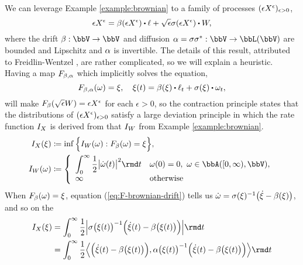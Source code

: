 \begin{example}[Diffusions]
  We can leverage Example \ref{example:brownian} to a family of processes $(\epsilon X^\epsilon)_{\epsilon>0}$,
  \begin{equation}
    \label{eq:F-brownian-drift}
    \Xe = \affDrift(\Xe) \shortInt \leb + \sqrt\epsilon \affDiffSqrt(\Xe) \shortInt \W,
  \end{equation}
  where the drift $\affDrift: \vecSpace \rightarrow \vecSpace$ and diffusion $\affDiff = \affDiffSqrt\affDiffSqrt^*: \vecSpace \rightarrow \bbL(\vecSpace)$ are bounded and Lipschitz and $\alpha$ is invertible.
  The details of this result, attributed to Freidlin-Wentzel \cite[Theorems 5.6.3 and 5.6.7]{dembo2010}, are rather complicated, so we will explain a heuristic.
  Having a map $F_{\beta,\alpha}$ which implicitly solves the equation,
  \begin{equation*}
    F_{\affDrift,\affDiff}(\omega) = \pathVar, \quad \pathVar(t) = \affDrift(\pathVar) \shortInt \leb_t + \affDiffSqrt(\pathVar) \shortInt \omega_t,
  \end{equation*}
  will make $F_\beta(\sqrt\epsilon W) = \epsilon X^\epsilon$ for each $\epsilon > 0$, so the contraction principle states that the distributions of $(\epsilon X^\epsilon)_{\epsilon>0}$ satisfy a large deviation principle in which the rate function $I_X$ is derived from that $I_W$ from Example \ref{example:brownian}.
  \begin{align*}
    \rf_\X(\pathVar) &\defeq \inf\Big\{ \rf_\W(\omega) : F_\affDrift(\omega) = \pathVar \Big\},\\
    \rf_\W(\omega) &\defeq \left\{\begin{array}{ll}
      \displaystyle\int_0^\infty \frac12\big|\dot\omega(t)\big|^2 \rmd t & \omega(0) = 0, ~ \omega \in \acpathSpace{[0,\infty)}{\vecSpace}, \\
      \infty & \text{otherwise}
    \end{array}\right.
  \end{align*}
  When $F_\beta(\omega) = \xi$, equation (\ref{eq:F-brownian-drift}) tells us $\dot\omega = \sigma(\xi)^{-1} \big(\dot{\xi} - \beta(\xi)\big)$, and so on the 
  \begin{align*}
    \rf_\X(\pathVar) 
    &= \int_0^\infty \frac12\Big|\affDiffSqrt\big(\pathVar(t)\big)^{-1}\Big(\dot\pathVar(t)-\affDrift\big(\pathVar(t)\big)\Big)\Big| \rmd t  \\
    &= \int_0^\infty \frac12 \Bprj{\Big(\dot\pathVar(t)-\affDrift\big(\pathVar(t)\big)\Big)}{\affDiff\big(\pathVar(t)\big)^{-1}\Big(\dot\pathVar(t)-\affDrift\big(\pathVar(t)\big)\Big)} \rmd t
  \end{align*}
  

\end{example}

